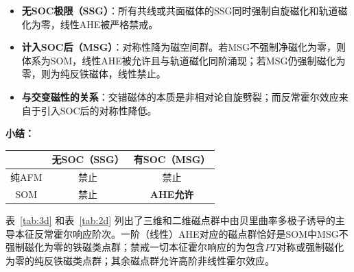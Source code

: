 \begin{itemize}
    \item \textbf{无SOC极限（SSG）}：所有共线或共面磁体的SSG同时强制自旋磁化和轨道磁化为零，线性AHE被严格禁戒。
    \item \textbf{计入SOC后（MSG）}：对称性降为磁空间群。若MSG不强制净磁化为零，则体系为SOM，线性AHE被允许且与轨道磁化同阶涌现；若MSG仍强制磁化为零，则为纯反铁磁体，线性禁止。
    \item \textbf{与交变磁性的关系}：交错磁体的本质是非相对论自旋劈裂；而反常霍尔效应来自于引入SOC后的对称性降低。
\end{itemize}
\vspace{5mm}
\textbf{小结：}
\begin{center}
\begin{tabular}{c c c}
\toprule
& 无SOC（SSG） & 有SOC（MSG） \\
\midrule
纯AFM & 禁止 & 禁止 \\
SOM   & 禁止 & \textbf{AHE允许} \\
\bottomrule
\end{tabular}
\end{center}
\vspace{5mm}
表~\ref{tab:3d} 和表~\ref{tab:2d} 列出了三维和二维磁点群中由贝里曲率多极子诱导的主导本征反常霍尔响应阶次。一阶（线性）AHE对应的磁点群恰好是SOM中MSG不强制磁化为零的铁磁类点群；禁戒一切本征霍尔响应的为包含$PT$对称或强制磁化为零的纯反铁磁类点群；其余磁点群允许高阶非线性霍尔效应。


